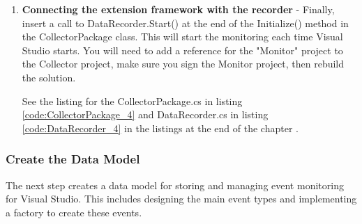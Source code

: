 \begin{enumerate}
\item {\bf Connecting the extension framework with the recorder} -
Finally, insert a call to DataRecorder.Start() at the end of the Initialize() method in the CollectorPackage class.  This will start the monitoring each time Visual Studio starts.  You will need to add a reference for the "Monitor" project to the Collector project, make sure you sign the Monitor project, then rebuild the solution.  

See the listing for the CollectorPackage.cs in listing \ref{code:CollectorPackage_4} and DataRecorder.cs in listing \ref{code:DataRecorder_4} in the listings at the end of the chapter .


\end{enumerate}

\subsubsection{Create the Data Model}

The next step creates a data model for storing and managing event monitoring for Visual Studio. This includes designing the main event types and implementing a factory to create these events. 


